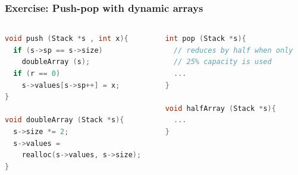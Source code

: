 \documentclass[aspectratio=169]{beamer}
\begin{document}
\begin{frame}[fragile]\frametitle{Exercise: Push-pop with dynamic arrays}
    

\begin{columns}
\begin{column}{.48\textwidth}
\begin{lstlisting}[language=C++, emph={push,pop,doubleArray,realloc}]
void push (Stack *s , int x){
  if (s->sp == s->size)
    doubleArray (s);
  if (r == 0)
    s->values[s->sp++] = x;
}

void doubleArray (Stack *s){
  s->size *= 2;
  s->values =
    realloc(s->values, s->size);
}
\end{lstlisting}
%
\end{column}
\begin{column}{.50\textwidth}
%
\begin{lstlisting}[language=C++, emph={push,pop,doubleArray,realloc}]
int pop (Stack *s){
  // reduces by half when only
  // 25% capacity is used
  ...
}

void halfArray (Stack *s){
  ...
}
\end{lstlisting}
%
\end{column}
\end{columns}


\end{frame}
\end{document}
